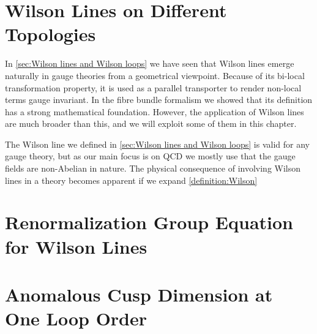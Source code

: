 \section{Wilson Lines on Different Topologies}
In \cref{sec:Wilson lines and Wilson loops} we have seen that Wilson lines emerge naturally in gauge theories from a geometrical viewpoint. Because of its bi-local transformation property, it is used as a parallel transporter to render non-local terms gauge invariant. In the fibre bundle formalism we showed that its definition has a strong mathematical foundation. However, the application of Wilson lines are much broader than this, and we will exploit some of them in this chapter.

The Wilson line we defined in \cref{sec:Wilson lines and Wilson loops} is valid for any gauge theory, but as our main focus is on QCD we mostly use that the gauge fields are non-Abelian in nature. The physical consequence of involving Wilson lines in a theory becomes apparent if we expand \cref{definition:Wilson}





\section{Renormalization Group Equation for Wilson Lines}

\section{Anomalous Cusp Dimension at One Loop Order}